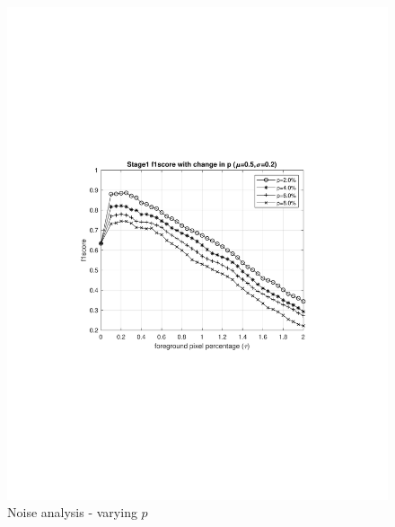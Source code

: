\begin{figure}[ht]
    \centering
    \includegraphics[width=\linewidth,trim={100 240 100 240},clip]{images/noise-analysis-mog-p}
    \caption{Noise analysis - varying $p$}
    \label{fig:noise-analysis-mog-p}
\end{figure}

